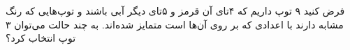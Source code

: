 فرض کنید ۹ توپ داریم که ۴تای آن قرمز و ۵تای دیگر آبی باشند و توپ‌هایی که رنگ مشابه دارند با اعدادی که بر روی آن‌ها است متمایز شده‌اند. به چند حالت می‌توان ۳ توپ انتخاب کرد؟